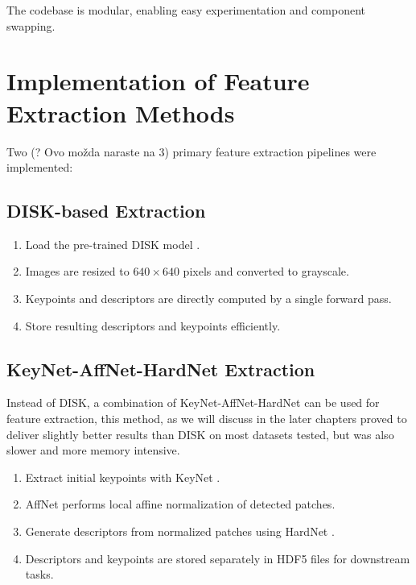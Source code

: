 The codebase is modular, enabling easy experimentation and component swapping.

\section{Implementation of Feature Extraction Methods}
\label{sec:implementation_feature_extraction}

Two (? Ovo možda naraste na 3) primary feature extraction pipelines were implemented:

\subsection{DISK-based Extraction}
\begin{enumerate}
    \item Load the pre-trained DISK model \cite{tyszkiewicz2020disklearninglocalfeatures}.
    \item Images are resized to $640\times640$ pixels and converted to grayscale.
    \item Keypoints and descriptors are directly computed by a single forward pass.
    \item Store resulting descriptors and keypoints efficiently.
\end{enumerate}

\subsection{KeyNet-AffNet-HardNet Extraction}
Instead of DISK, a combination of KeyNet-AffNet-HardNet can be used for feature extraction, this method, as we will discuss in the later chapters proved to deliver slightly better results than DISK on most datasets tested, but was also slower and more memory intensive. 

\begin{enumerate}
    \item Extract initial keypoints with KeyNet \cite{Barroso2019KeyNet}.
    \item AffNet\cite{mishkin2018repeatabilityenoughlearningaffine} performs local affine normalization of detected patches.
    \item Generate descriptors from normalized patches using HardNet \cite{Mishchuk2017HardNet}.
    \item Descriptors and keypoints are stored separately in HDF5 files for downstream tasks.
\end{enumerate}

